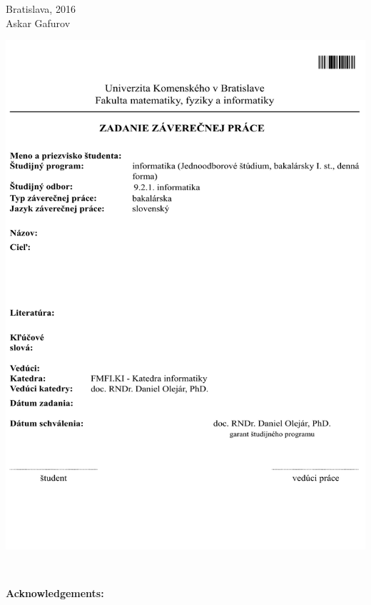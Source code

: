 \documentclass[12pt, oneside]{book}
\def\mfrok{2016}
\def\mfautor{Askar Gafurov}
\def\mfmiesto{Bratislava, \mfrok}
\begin{document}
\noindent \mfmiesto\\
\mfautor

\eject %





\newpage 
\thispagestyle{empty}
\hspace{-2cm}\includegraphics[width=1.1\textwidth]{images/zadanie}


\frontmatter

\setcounter{page}{3}
\newpage 
~

\vfill
{\bf Acknowledgements:}
\end{document}
